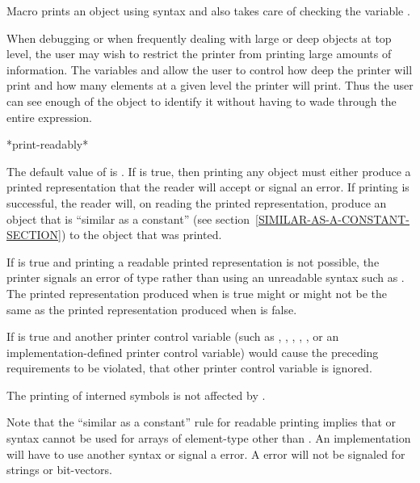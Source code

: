 Macro  prints an object using 
syntax and also takes care of checking the variable .

When debugging or when frequently dealing with large or
deep objects at top level, the user may wish to restrict the printer
from printing large amounts of information.  The variables
 and  allow the user to control how deep
the printer will print and how many elements at a given level the
printer will print.  Thus the user can see enough of the object to
identify it without having to wade through the entire expression.

\begin{defun}[Variable]
*print-readably*

The default value of  is
  .  If  is true, then printing any object must either
  produce a
  printed representation that the reader will accept or signal an error.
  If printing is successful, the reader will, on reading the printed representation,
  produce an object that is ``similar as a constant''
  (see section~\ref{SIMILAR-AS-A-CONSTANT-SECTION}) to the object that was printed.

  If  is true and printing a readable printed
  representation is not possible, the printer signals an error of type
   rather than using an unreadable syntax such as \cd{\#<}.
  The printed representation produced when  is true might
  or might not be the same as the printed representation produced when
   is false.

  If  is true and another printer control variable
  (such as , , , ,
  , or an implementation-defined printer control variable)
  would cause the preceding requirements to be violated, that other
  printer control variable is ignored.

  The printing of interned symbols is not affected by .

  Note that the ``similar as a constant'' rule for readable printing
  implies that  or \cd{\#(} syntax cannot be used for arrays of element-type
  other than .  An implementation will have to use another syntax or
  signal a  error.  A  error will not
  be signaled for strings or bit-vectors.


\end{defun}
